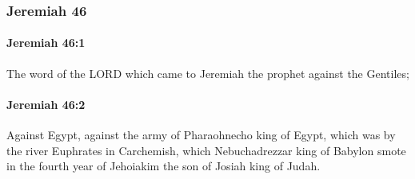 	\subsubsection{Jeremiah 46} %
		\label{JEREMIAH-46}

		\paragraph{Jeremiah 46:1} %
			\label{JEREMIAH-46-1}

			The word of the LORD which came to Jeremiah the prophet against the Gentiles;


		\paragraph{Jeremiah 46:2} %
			\label{JEREMIAH-46-2}

			Against Egypt, against the army of Pharaohnecho king of Egypt, which was by the river Euphrates in Carchemish, which Nebuchadrezzar king of Babylon smote in the fourth year of Jehoiakim the son of Josiah king of Judah.

